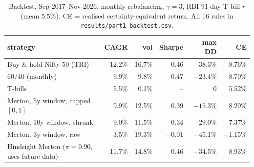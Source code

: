 \documentclass[10pt,a4paper]{article}
\begin{document}
\begin{table}[!htb]\centering\footnotesize\caption{Backtest, Sep-2017--Nov-2026, monthly rebalancing, $\gamma{=}3$, RBI 91-day T-bill $r$ (mean $5.5\%$). CE = realised certainty-equivalent return. All 16 rules in \texttt{results/part1\_backtest.csv}.}
\begin{tabular}{lrrrrr}\toprule
strategy & CAGR & vol & Sharpe & max DD & CE\\\midrule
Buy \& hold Nifty 50 (TRI) & 12.2\% & 16.7\% & 0.46 & $-38.3\%$ & 8.76\%\\
60/40 (monthly) & 9.9\% & 9.8\% & 0.47 & $-23.4\%$ & 8.70\%\\
T-bills & 5.5\% & 0.1\% & -- & 0 & 5.52\%\\
Merton, 5y window, capped $[0,1]$ & 9.9\% & 12.5\% & 0.39 & $-15.3\%$ & 8.20\%\\
Merton, 10y window, shrunk & 9.0\% & 11.5\% & 0.34 & $-29.0\%$ & 7.37\%\\
Merton, 3y window, raw & 3.5\% & 19.3\% & $-0.01$ & $-45.1\%$ & $-1.15\%$\\
Hindsight Merton ($\pi=0.90$, uses future data) & 11.7\% & 14.8\% & 0.46 & $-34.5\%$ & 8.93\%\\\bottomrule\end{tabular}\end{table}
\end{document}
